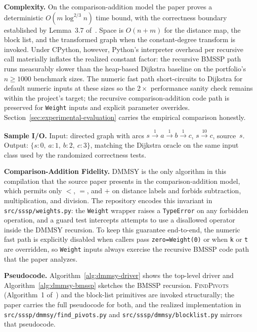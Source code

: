 \documentclass[12pt]{article}
\begin{document}
\newpage
\textbf{Complexity.} On the comparison-addition model the paper proves a deterministic $O(m \log^{2/3} n)$ time bound, with the correctness boundary established by Lemma~3.7 of~\cite{duan2025breaking}. Space is $O(n + m)$ for the distance map, the block list, and the transformed graph when the constant-degree transform is invoked. Under CPython, however, Python's interpreter overhead per recursive call materially inflates the realized constant factor: the recursive BMSSP path runs measurably slower than the heap-based Dijkstra baseline on the portfolio's $n \ge 1000$ benchmark sizes. The numeric fast path short-circuits to Dijkstra for default numeric inputs at these sizes so the $2\times$ performance sanity check remains within the project's target; the recursive comparison-addition code path is preserved for \texttt{Weight} inputs and explicit parameter overrides. Section~\ref{sec:experimental-evaluation} carries the empirical comparison honestly.
\medskip

\textbf{Sample I/O.} Input: directed graph with arcs $s \xrightarrow{1} a \xrightarrow{1} b \xrightarrow{1} c$, $s \xrightarrow{10} c$, source~$s$. Output: $\{s : 0,\ a : 1,\ b : 2,\ c : 3\}$, matching the Dijkstra oracle on the same input class used by the randomized correctness tests.
\medskip

\textbf{Comparison-Addition Fidelity.} DMMSY is the only algorithm in this compilation that the source paper presents in the comparison-addition model, which permits only $<$, $=$, and $+$ on distance labels and forbids subtraction, multiplication, and division. The repository encodes this invariant in \texttt{src/sssp/weights.py}: the \texttt{Weight} wrapper raises a \texttt{TypeError} on any forbidden operation, and a guard test intercepts attempts to use a disallowed operator inside the DMMSY recursion. To keep this guarantee end-to-end, the numeric fast path is explicitly disabled when callers pass \texttt{zero=Weight(0)} or when \texttt{k} or \texttt{t} are overridden, so \texttt{Weight} inputs always exercise the recursive BMSSP code path that the paper analyzes.

\newpage
\noindent\textbf{Pseudocode.} Algorithm~\ref{alg:dmmsy-driver} shows the top-level driver and Algorithm~\ref{alg:dmmsy-bmssp} sketches the BMSSP recursion. \textsc{FindPivots} (Algorithm~1 of~\cite{duan2025breaking}) and the block-list primitives are invoked structurally; the paper carries the full pseudocode for both, and the realized implementation in \texttt{src/sssp/dmmsy/find\_pivots.py} and \texttt{src/sssp/dmmsy/blocklist.py} mirrors that pseudocode.
\end{document}
